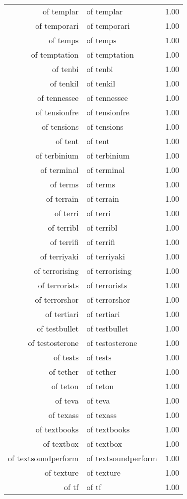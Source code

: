 \begin{table}[ht]
\begin{tabular}{rlr}
  of templar & of templar & 1.00 \\ 
  of temporari & of temporari & 1.00 \\ 
  of temps & of temps & 1.00 \\ 
  of temptation & of temptation & 1.00 \\ 
  of tenbi & of tenbi & 1.00 \\ 
  of tenkil & of tenkil & 1.00 \\ 
  of tennessee & of tennessee & 1.00 \\ 
  of tensionfre & of tensionfre & 1.00 \\ 
  of tensions & of tensions & 1.00 \\ 
  of tent & of tent & 1.00 \\ 
  of terbinium & of terbinium & 1.00 \\ 
  of terminal & of terminal & 1.00 \\ 
  of terms & of terms & 1.00 \\ 
  of terrain & of terrain & 1.00 \\ 
  of terri & of terri & 1.00 \\ 
  of terribl & of terribl & 1.00 \\ 
  of terrifi & of terrifi & 1.00 \\ 
  of terriyaki & of terriyaki & 1.00 \\ 
  of terrorising & of terrorising & 1.00 \\ 
  of terrorists & of terrorists & 1.00 \\ 
  of terrorshor & of terrorshor & 1.00 \\ 
  of tertiari & of tertiari & 1.00 \\ 
  of testbullet & of testbullet & 1.00 \\ 
  of testosterone & of testosterone & 1.00 \\ 
  of tests & of tests & 1.00 \\ 
  of tether & of tether & 1.00 \\ 
  of teton & of teton & 1.00 \\ 
  of teva & of teva & 1.00 \\ 
  of texass & of texass & 1.00 \\ 
  of textbooks & of textbooks & 1.00 \\ 
  of textbox & of textbox & 1.00 \\ 
  of textsoundperform & of textsoundperform & 1.00 \\ 
  of texture & of texture & 1.00 \\ 
  of tf & of tf & 1.00 \\ 

\end{tabular}
\end{table}
